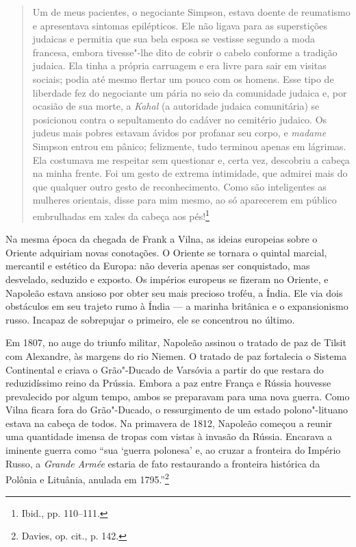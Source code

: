\begin{quote}
Um de meus pacientes, o negociante Simpson, estava doente de reumatismo
e apresentava sintomas epilépticos. Ele não ligava para as superstições
judaicas e permitia que sua bela esposa se vestisse segundo a moda
francesa, embora tivesse"-lhe dito de cobrir o cabelo conforme a tradição
judaica. Ela tinha a própria carruagem e era livre para sair em visitas
sociais; podia até mesmo flertar um pouco com os homens. Esse tipo de
liberdade fez do negociante um pária no seio da comunidade judaica e,
por ocasião de sua morte, a \textit{Kahal} (a autoridade judaica comunitária) se
posicionou contra o sepultamento do cadáver no cemitério judaico. Os
judeus mais pobres estavam ávidos por profanar seu corpo, e \textit{madame}
Simpson entrou em pânico; felizmente, tudo terminou apenas em lágrimas.
Ela costumava me respeitar sem questionar e, certa vez, descobriu a
cabeça na minha frente. Foi um gesto de extrema intimidade, que admirei
mais do que qualquer outro gesto de reconhecimento. Como são
inteligentes as mulheres orientais, disse para mim mesmo, ao só
aparecerem em público embrulhadas em xales da cabeça aos pés!\footnote{Ibid., pp. 110--111.} \end{quote}

Na mesma época da chegada de Frank a Vilna, as ideias europeias sobre o
Oriente adquiriam novas conotações. O Oriente se tornara o quintal
marcial, mercantil e estético da Europa: não deveria apenas ser
conquistado, mas desvelado, seduzido e exposto. Os impérios europeus se
fizeram no Oriente, e Napoleão estava ansioso por obter seu mais
precioso troféu, a Índia. Ele via dois obstáculos em seu trajeto rumo à
Índia --- a marinha britânica e o expansionismo russo. Incapaz de
sobrepujar o primeiro, ele se concentrou no último.

Em 1807, no auge do triunfo militar, Napoleão assinou o tratado de paz
de Tilsit com Alexandre, às margens do rio Niemen. O tratado de paz
fortalecia o Sistema Continental e criava o Grão"-Ducado de Varsóvia a
partir do que restara do reduzidíssimo reino da Prússia. Embora a paz
entre França e Rússia houvesse prevalecido por algum tempo, ambos se
preparavam para uma nova guerra. Como Vilna ficara fora do Grão"-Ducado,
o ressurgimento de um estado polono"-lituano estava na cabeça de todos.
Na primavera de 1812, Napoleão começou a reunir uma quantidade imensa de
tropas com vistas à invasão da Rússia. Encarava a iminente guerra como
``sua `guerra polonesa' e, ao cruzar a fronteira do Império Russo, a
\textit{Grande Armée} estaria de fato restaurando a fronteira histórica da
Polônia e Lituânia, anulada em 1795.''\footnote{Davies, op. cit., p. 142.}


